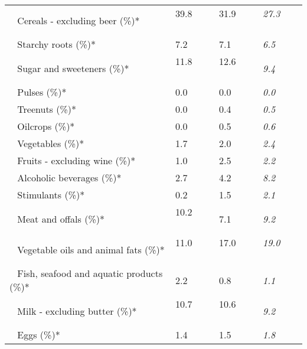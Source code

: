 \begin{tabular}{L{3.9cm} R{1cm} R{1cm} R{1cm}}
	 ~ Cereals - excluding beer (\%)* & 39.8 ~ \ \ & 31.9 ~ \ \ & \textit{27.3} ~ \ \ \\ 
	 ~ Starchy roots (\%)* & 7.2 ~ \ \ & 7.1 ~ \ \ & \textit{6.5} ~ \ \ \\ 
	 ~ Sugar and sweeteners (\%)* & 11.8 ~ \ \ & 12.6 ~ \ \ & \textit{9.4} ~ \ \ \\ 
	 ~ Pulses (\%)* & 0.0 ~ \ \ & 0.0 ~ \ \ & \textit{0.0} ~ \ \ \\ 
	 ~ Treenuts (\%)* & 0.0 ~ \ \ & 0.4 ~ \ \ & \textit{0.5} ~ \ \ \\ 
	 ~ Oilcrops (\%)* & 0.0 ~ \ \ & 0.5 ~ \ \ & \textit{0.6} ~ \ \ \\ 
	 ~ Vegetables (\%)* & 1.7 ~ \ \ & 2.0 ~ \ \ & \textit{2.4} ~ \ \ \\ 
	 ~ Fruits - excluding wine (\%)* & 1.0 ~ \ \ & 2.5 ~ \ \ & \textit{2.2} ~ \ \ \\ 
	 ~ Alcoholic beverages (\%)* & 2.7 ~ \ \ & 4.2 ~ \ \ & \textit{8.2} ~ \ \ \\ 
	 ~ Stimulants (\%)* & 0.2 ~ \ \ & 1.5 ~ \ \ & \textit{2.1} ~ \ \ \\ 
	 ~ Meat and offals (\%)* & 10.2 ~ \ \ & 7.1 ~ \ \ & \textit{9.2} ~ \ \ \\ 
	 ~ Vegetable oils and animal fats (\%)* & 11.0 ~ \ \ & 17.0 ~ \ \ & \textit{19.0} ~ \ \ \\ 
	 ~ Fish, seafood and aquatic products (\%)* & 2.2 ~ \ \ & 0.8 ~ \ \ & \textit{1.1} ~ \ \ \\ 
	 ~ Milk - excluding butter (\%)* & 10.7 ~ \ \ & 10.6 ~ \ \ & \textit{9.2} ~ \ \ \\ 
	 ~ Eggs (\%)* & 1.4 ~ \ \ & 1.5 ~ \ \ & \textit{1.8} ~ \ \ \\ 
       \toprule
      \end{tabular}
      \clearpage
{}
